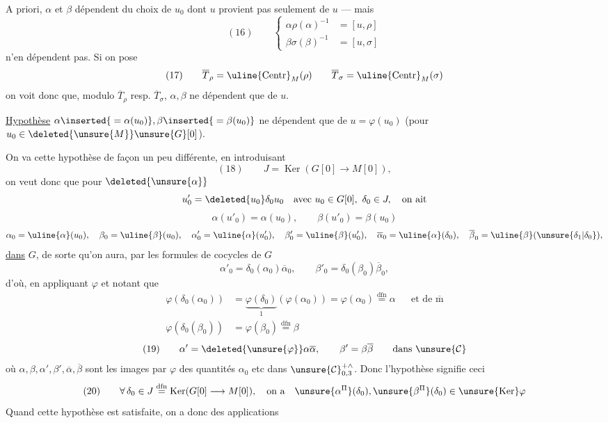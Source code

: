
A priori, $\alpha$ et $\beta$ dépendent du choix de $u_0$ dont $u$ provient
pas seulement de $u$ --- mais
\[
(16)\qquad
\left\{\begin{aligned}
\alpha\rho(\alpha)^{-1}&=[u,\rho]\\
\beta\sigma(\beta)^{-1}&=[u,\sigma]
\end{aligned}\right.
\]
n'en dépendent pas. Si on pose
\[
(17)\qquad
\overline{T}_{\rho}=\uline{\mathrm{Centr}}_M(\rho)
\qquad
\overline{T}_{\sigma}=\uline{\mathrm{Centr}}_M(\sigma)
\]
on voit donc que, modulo $\overline{T}_{\rho}$ resp. $\overline{T}_{\sigma}$,
$\alpha,\beta$ ne dépendent que de $u$.

\uline{Hypothèse}
$\alpha\inserted{{}=\alpha(u_0)},\beta\inserted{{}=\beta(u_0)}$
ne dépendent que de $u=\varphi(u_0)$
(pour $u_0\in\deleted{\unsure{M}}\unsure{G}[0]$).

On va  cette hypothèse de façon un peu différente,
en introduisant
\[
(18)\qquad J=\operatorname{Ker}(G[0]\longrightarrow M[0]),
\]
on veut donc que pour $\deleted{\unsure{\alpha}}$
\[
u'_0=\deleted{u_0}\delta_0u_0\quad
\text{avec }u_0\in G[0],\ \delta_0\in J,\quad\text{on ait}
\]
\[
\alpha(u'_0)=\alpha(u_0),\qquad \beta(u'_0)=\beta(u_0)
\]
\[
\begin{gathered}
\alpha_0=\uline{\alpha}(u_0),\quad
\beta_0=\uline{\beta}(u_0),\quad
\alpha'_0=\uline{\alpha}(u'_0),\quad
\beta'_0=\uline{\beta}(u'_0),\quad
\overline{\alpha}_0=\uline{\alpha}(\delta_0),\quad
\overline{\beta}_0=\uline{\beta}(\unsure{\delta_1|\delta_0}),
\end{gathered}
\]
\uline{dans} $G$, de sorte qu'on aura, par les formules de cocycles de $G$
\[
\alpha'_0=\delta_0(\alpha_0)\overline{\alpha}_0,
\qquad
\beta'_0=\delta_0(\beta_0)\overline{\beta}_0,
\]
d'où, en appliquant $\varphi$ et notant que
\[
\begin{aligned}
\varphi(\delta_0(\alpha_0))
&=\underbrace{\varphi(\delta_0)}_{1}(\varphi(\alpha_0))
=\varphi(\alpha_0)\overset{\mathrm{dfn}}=\alpha
&&\text{et de }\overline{\mathrm m}\\
\varphi(\delta_0(\beta_0))&=\varphi(\beta_0)\overset{\mathrm{dfn}}=\beta
\end{aligned}
\]
\[
(19)\qquad
\alpha'=\deleted{\unsure{\varphi}}\alpha\overline{\alpha},\qquad
\beta'=\beta\overline{\beta}\qquad\text{dans }\unsure{\mathcal{C}}
\]
où $\alpha,\beta,\alpha',\beta',\overline{\alpha},\overline{\beta}$ sont les images par
$\varphi$ des quantités $\alpha_0$ etc dans $\unsure{\mathcal{C}}_{0,3}^{+\wedge}$.
Donc l'hypothèse signifie ceci
\[
(20)\qquad
\forall\,\delta_0\in J\overset{\mathrm{dfn}}=
\operatorname{Ker}(G[0]\longrightarrow M[0]),\quad
\text{on a}\quad
\unsure{\alpha^{\Pi}}(\delta_0),\unsure{\beta^{\Pi}}(\delta_0)
\in\unsure{\operatorname{Ker}}\varphi
\]
Quand cette hypothèse est satisfaite, on a donc des applications

